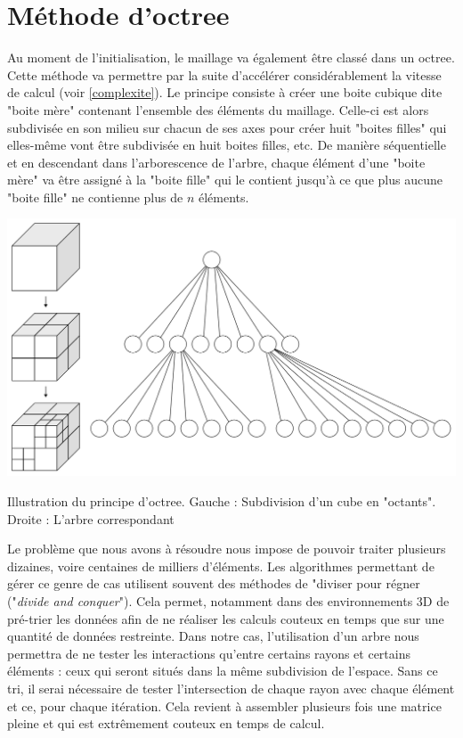 \section{Méthode d'octree}
Au moment de l'initialisation, le maillage va également être classé dans un \gls{octree}. Cette méthode va permettre par la suite d'accélérer considérablement la vitesse de calcul \cite[p. 5]{octree} (voir \ref{complexite}). Le principe consiste à créer une boite cubique dite "boite mère" contenant l'ensemble des éléments du maillage. Celle-ci est alors subdivisée en son milieu sur chacun de ses axes pour créer huit "boites filles" qui elles-même vont être subdivisée en huit boites filles, etc. De manière séquentielle et en descendant dans l'arborescence de l'arbre, chaque élément d'une "boite mère" va être assigné à la "boite fille" qui le contient jusqu'à ce que plus aucune "boite fille" ne contienne plus de $n$ éléments.

\begin{figureth}
	\includegraphics[width=0.6\linewidth]{images/octree}
	\caption{Illustration du principe d'\gls{octree}. Gauche : Subdivision d'un cube en "octants". Droite : L'arbre correspondant}
	\label{octree}
\end{figureth}

Le problème que nous avons à résoudre nous impose de pouvoir traiter plusieurs dizaines, voire centaines de milliers d'éléments. Les algorithmes permettant de gérer ce genre de cas utilisent souvent des méthodes de "diviser pour régner ("\textit{divide and conquer}"). Cela permet, notamment dans des environnements 3D de pré-trier les données afin de ne réaliser les calculs couteux en temps que sur une quantité de données restreinte. Dans notre cas, l'utilisation d'un arbre nous permettra de ne tester les interactions qu'entre certains rayons et certains éléments : ceux qui seront situés dans la même subdivision de l'espace. Sans ce tri, il serai nécessaire de tester l'intersection de chaque rayon avec chaque élément et ce, pour chaque itération. Cela revient à assembler plusieurs fois une matrice pleine et qui est extrêmement couteux en temps de calcul.


